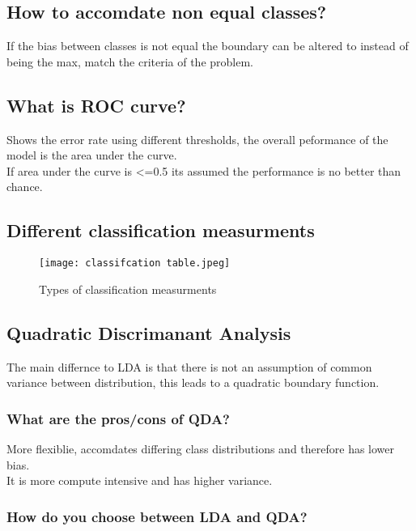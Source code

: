 \documentclass[11pt]{scrartcl} %
\begin{document}
\subsection{How to accomdate non equal classes?}

If the bias between classes is not equal the boundary can be altered to instead of being the max,
match the criteria of the problem.

\subsection{What is ROC curve?}

Shows the error rate using different thresholds, the overall peformance of the model is the
area under the curve.\\

If area under the curve is <=0.5 its assumed the performance is no better than chance.

\subsection{Different classification measurments}

\begin{figure}[h] %
	\centering
	\texttt{[image: classifcation table.jpeg]} %
	\caption{Types of classification measurments}
\end{figure}

\subsection{Quadratic Discrimanant Analysis}

The main differnce to LDA is that there is not an assumption of common variance between distribution,
this leads to a quadratic boundary function. 

\subsubsection{What are the pros/cons of QDA?}

More flexiblie, accomdates differing class distributions and therefore has lower bias.\\

It is more compute intensive and has higher variance.

\subsubsection{How do you choose between LDA and QDA?}
\end{document}
